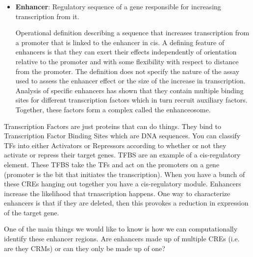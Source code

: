 \begin{itemize}
    \item \textbf{Enhancer}: Regulatory sequence of a gene responsible for increasing transcription from it.

    Operational definition describing a sequence that increases transcription from a promoter that is linked to the enhancer in cis. A defining feature of enhancers is that they can exert their effects independently of orientation relative to the promoter and with some flexibility with respect to distance from the promoter. The definition does not specify the nature of the assay used to assess the enhancer effect or the size of the increase in transcription. Analysis of specific enhancers has shown that they contain multiple binding sites for different transcription factors which in turn recruit auxiliary factors. Together, these factors form a complex called the enhanceosome.

    
\end{itemize}

    Transcription Factors are just proteins that can do things. They bind to Transcription Factor Binding Sites which are DNA sequences. You can classify TFs into either Activators or Repressors according to whether or not they activate or repress their target genes. TFBS are an example of a cis-regulatory element. These TFBS take the TFs and act on the promoters on a gene (promoter is the bit that initiates the transcription). When you have a bunch of these CREs hanging out together you have a cis-regulatory module. Enhancers increase the likelihood that trnascription happens. One way to characterize enhancers is that if they are deleted, then this provokes a reduction in expression of the target gene. 
    
    One of the main things we would like to know is how we can computationally identify these enhancer regions. Are enhancers made up of multiple CREs (i.e. are they CRMs) or can they only be made up of one?